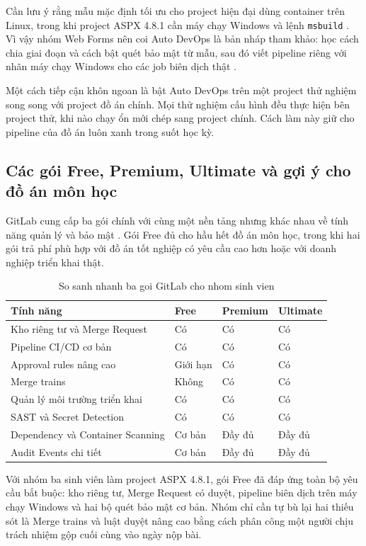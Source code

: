 Cần lưu ý rằng mẫu mặc định tối ưu cho project hiện đại dùng container trên Linux, trong khi project ASPX 4.8.1 cần máy chạy Windows và lệnh \verb|msbuild| \cite{msmsbuild}. Vì vậy nhóm Web Forms nên coi Auto DevOps là bản nháp tham khảo: học cách chia giai đoạn và cách bật quét bảo mật từ mẫu, sau đó viết pipeline riêng với nhãn máy chạy Windows cho các job biên dịch thật \cite{msnetfx}.

Một cách tiếp cận khôn ngoan là bật Auto DevOps trên một project thử nghiệm song song với project đồ án chính. Mọi thử nghiệm cấu hình đều thực hiện bên project thử, khi nào chạy ổn mới chép sang project chính. Cách làm này giữ cho pipeline của đồ án luôn xanh trong suốt học kỳ.

\subsection{Các gói Free, Premium, Ultimate và gợi ý cho đồ án môn học}

GitLab cung cấp ba gói chính với cùng một nền tảng nhưng khác nhau về tính năng quản lý và bảo mật \cite{gitlabdocs}. Gói Free đủ cho hầu hết đồ án môn học, trong khi hai gói trả phí phù hợp với đồ án tốt nghiệp có yêu cầu cao hơn hoặc với doanh nghiệp triển khai thật.

\begin{table}[H]
\centering
\caption{So sanh nhanh ba goi GitLab cho nhom sinh vien}
\label{tab:c53-plans}
\begin{tabular}{llll}
\toprule
Tính năng & Free & Premium & Ultimate \\
\midrule
Kho riêng tư và Merge Request & Có & Có & Có \\
Pipeline CI/CD cơ bản & Có & Có & Có \\
Approval rules nâng cao & Giới hạn & Có & Có \\
Merge trains & Không & Có & Có \\
Quản lý môi trường triển khai & Có & Có & Có \\
SAST và Secret Detection & Có & Có & Có \\
Dependency và Container Scanning & Cơ bản & Đầy đủ & Đầy đủ \\
Audit Events chi tiết & Cơ bản & Đầy đủ & Đầy đủ \\
\bottomrule
\end{tabular}
\end{table}

Với nhóm ba sinh viên làm project ASPX 4.8.1, gói Free đã đáp ứng toàn bộ yêu cầu bắt buộc: kho riêng tư, Merge Request có duyệt, pipeline biên dịch trên máy chạy Windows và hai bộ quét bảo mật cơ bản. Nhóm chỉ cần tự bù lại hai thiếu sót là Merge trains và luật duyệt nâng cao bằng cách phân công một người chịu trách nhiệm gộp cuối cùng vào ngày nộp bài.

